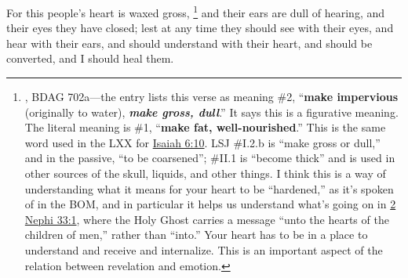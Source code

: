 			For this people's heart is waxed gross,%
				\footnote{%
					, BDAG 702a---the entry lists this verse as meaning \#2, ``\textbf{make impervious} (originally to water), \textbf{\textit{make gross, dull}}.'' It says this is a figurative meaning. The literal meaning is \#1, ``\textbf{make fat, well-nourished}.'' This is the same word used in the LXX for \hyperref[ISAIAH-6-10]{Isaiah 6:10}. LSJ \#I.2.b is ``make gross or dull,'' and in the passive, ``to be coarsened''; \#II.1 is ``become thick'' and is used in other sources of the skull, liquids, and other things. I think this is a way of understanding what it means for your heart to be ``hardened,'' as it's spoken of in the BOM, and in particular it helps us understand what's going on in \hyperref[2NEPHI-33-1]{2 Nephi 33:1}, where the Holy Ghost carries a message ``unto the hearts of the children of men,'' rather than ``into.'' Your heart has to be in a place to understand and receive and internalize. This is an important aspect of the relation between revelation and emotion.
					}
			and their ears are dull of hearing, and their eyes they have closed; lest at any time they should see with their eyes, and hear with their ears, and should understand with their heart, and should be converted, and I should heal them.

			\begin{framed}
			\scriptsize
				\begin{compactdesc}
					\item[SBLG] 
				\end{compactdesc}
			\end{framed}

